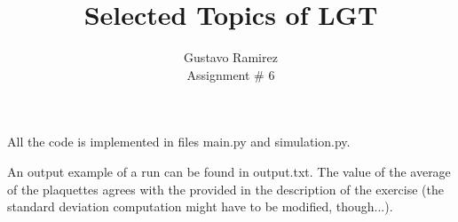 \documentclass[11pt]{article}
\title{\textbf{Selected Topics of LGT}}
\author{Gustavo Ramirez\\
		Assignment \# 6}
\date{}
\begin{document}
\maketitle


All the code is implemented in files main.py and simulation.py.

An output example of a run can be found in output.txt. The value of the average of the plaquettes agrees with the provided in the description of the exercise (the standard deviation computation might have to be modified, though...).
\end{document}
